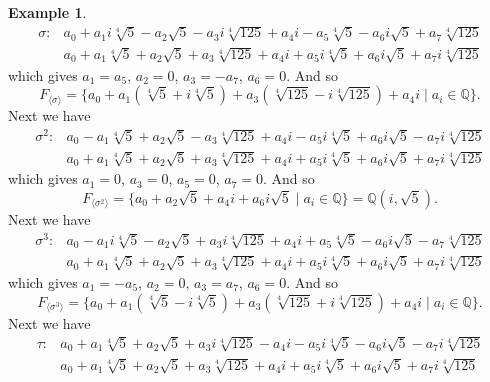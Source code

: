 \documentclass[leqno]{article}
\theoremstyle{definition}
\theoremstyle{remark}
\theoremstyle{definition}
\newtheorem{example}{Example}
\begin{document}
\begin{example}
            \begin{align*}
                \sigma:&a_0+a_1i\sqrt[4]{5}-a_2\sqrt{5}-a_3i\sqrt[4]{125}+a_4i-a_5\sqrt[4]{5}-a_6i\sqrt{5}+a_7\sqrt[4]{125} \\
                &a_0+a_1\sqrt[4]{5}+a_2\sqrt{5}+a_3\sqrt[4]{125}+a_4i+a_5i\sqrt[4]{5}+a_6i\sqrt{5}+a_7i\sqrt[4]{125}
            \end{align*}
        which gives $a_1=a_5$, $a_2=0$, $a_3=-a_7$, $a_6=0$. And so 
            \begin{equation*}
                F_{\langle\sigma\rangle}=\{a_0+a_1(\sqrt[4]{5}+i\sqrt[4]{5})+a_3(\sqrt[4]{125}-i\sqrt[4]{125})+a_4i\mid a_i\in\mathbb{Q}\}.
            \end{equation*}
        Next we have 
            \begin{align*}
                \sigma^2:&a_0-a_1\sqrt[4]{5}+a_2\sqrt{5}-a_3\sqrt[4]{125}+a_4i-a_5i\sqrt[4]{5}+a_6i\sqrt{5}-a_7i\sqrt[4]{125} \\
                &a_0+a_1\sqrt[4]{5}+a_2\sqrt{5}+a_3\sqrt[4]{125}+a_4i+a_5i\sqrt[4]{5}+a_6i\sqrt{5}+a_7i\sqrt[4]{125}
            \end{align*}
        which gives $a_1=0$, $a_3=0$, $a_5=0$, $a_7=0$. And so 
            \begin{equation*}
                F_{\langle\sigma^2\rangle}=\{a_0+a_2\sqrt{5}+a_4i+a_6i\sqrt{5}\mid a_i\in\mathbb{Q}\}=\mathbb{Q}(i,\sqrt{5}).
            \end{equation*}
        Next we have
            \begin{align*}
                \sigma^3:&a_0-a_1i\sqrt[4]{5}-a_2\sqrt{5}+a_3i\sqrt[4]{125}+a_4i+a_5\sqrt[4]{5}-a_6i\sqrt{5}-a_7\sqrt[4]{125} \\
                &a_0+a_1\sqrt[4]{5}+a_2\sqrt{5}+a_3\sqrt[4]{125}+a_4i+a_5i\sqrt[4]{5}+a_6i\sqrt{5}+a_7i\sqrt[4]{125}
            \end{align*}
        which gives $a_1=-a_5$, $a_2=0$, $a_3=a_7$, $a_6=0$. And so 
            \begin{equation*}
                F_{\langle\sigma^3\rangle}=\{a_0+a_1(\sqrt[4]{5}-i\sqrt[4]{5})+a_3(\sqrt[4]{125}+i\sqrt[4]{125})+a_4i\mid a_i\in\mathbb{Q}\}.
            \end{equation*}
        Next we have 
            \begin{align*}
                \tau:&a_0+a_1\sqrt[4]{5}+a_2\sqrt{5}+a_3i\sqrt[4]{125}-a_4i-a_5i\sqrt[4]{5}-a_6i\sqrt{5}-a_7i\sqrt[4]{125} \\
                &a_0+a_1\sqrt[4]{5}+a_2\sqrt{5}+a_3\sqrt[4]{125}+a_4i+a_5i\sqrt[4]{5}+a_6i\sqrt{5}+a_7i\sqrt[4]{125}

\end{align*}
\end{example}
\end{document}
